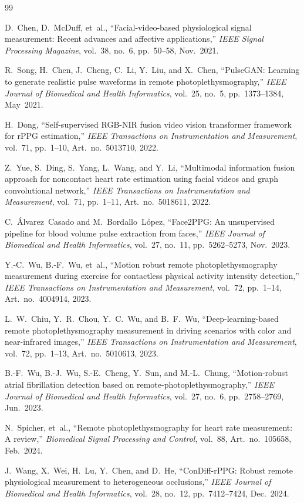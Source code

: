 \documentclass[11pt,a4paper]{report}
\begin{document}
\begin{thebibliography}{99}

D.~Chen, D.~McDuff, et~al.,
``Facial-video-based physiological signal measurement: Recent advances and affective applications,''
\emph{IEEE Signal Processing Magazine}, vol.~38, no.~6, pp.~50--58, Nov.~2021.

R.~Song, H.~Chen, J.~Cheng, C.~Li, Y.~Liu, and X.~Chen,
``PulseGAN: Learning to generate realistic pulse waveforms in remote photoplethysmography,''
\emph{IEEE Journal of Biomedical and Health Informatics}, vol.~25, no.~5, pp.~1373--1384, May~2021.

H.~Dong,
``Self-supervised RGB-NIR fusion video vision transformer framework for rPPG estimation,''
\emph{IEEE Transactions on Instrumentation and Measurement}, vol.~71, pp.~1--10, Art.~no.~5013710, 2022.

Z.~Yue, S.~Ding, S.~Yang, L.~Wang, and Y.~Li,
``Multimodal information fusion approach for noncontact heart rate estimation using facial videos and graph convolutional network,''
\emph{IEEE Transactions on Instrumentation and Measurement}, vol.~71, pp.~1--11, Art.~no.~5018611, 2022.

C.~{\'A}lvarez~Casado and M.~Bordallo~L{\'o}pez,
``Face2PPG: An unsupervised pipeline for blood volume pulse extraction from faces,''
\emph{IEEE Journal of Biomedical and Health Informatics}, vol.~27, no.~11, pp.~5262--5273, Nov.~2023.

Y.-C.~Wu, B.-F.~Wu, et~al.,
``Motion robust remote photoplethysmography measurement during exercise for contactless physical activity intensity detection,''
\emph{IEEE Transactions on Instrumentation and Measurement}, vol.~72, pp.~1--14, Art.~no.~4004914, 2023.

L.~W.~Chiu, Y.~R.~Chou, Y.~C.~Wu, and B.~F.~Wu,
``Deep-learning-based remote photoplethysmography measurement in driving scenarios with color and near-infrared images,''
\emph{IEEE Transactions on Instrumentation and Measurement}, vol.~72, pp.~1--13, Art.~no.~5010613, 2023.

B.-F.~Wu, B.-J.~Wu, S.-E.~Cheng, Y.~Sun, and M.-L.~Chung,
``Motion-robust atrial fibrillation detection based on remote-photoplethysmography,''
\emph{IEEE Journal of Biomedical and Health Informatics}, vol.~27, no.~6, pp.~2758--2769, Jun.~2023.

N.~Spicher, et~al.,
``Remote photoplethysmography for heart rate measurement: A review,''
\emph{Biomedical Signal Processing and Control}, vol.~88, Art.~no.~105658, Feb.~2024.

J.~Wang, X.~Wei, H.~Lu, Y.~Chen, and D.~He,
``ConDiff-rPPG: Robust remote physiological measurement to heterogeneous occlusions,''
\emph{IEEE Journal of Biomedical and Health Informatics}, vol.~28, no.~12, pp.~7412--7424, Dec.~2024.

\end{thebibliography}
\end{document}
